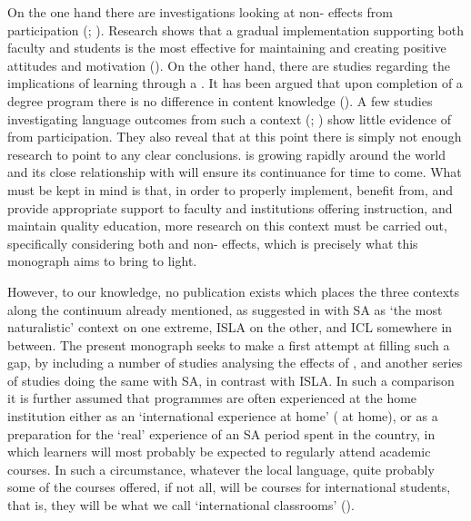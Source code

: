 \documentclass[output=paper]{langsci/langscibook}
\begin{document}
On the one hand there are investigations looking at non- effects from  participation (\citealt{Gao2008}; \citealt{GonzálezArdeo2016}). Research shows that a gradual implementation supporting both faculty and students is the most effective for maintaining and creating positive attitudes and motivation (\citealt{ChenKraklow2015}). On the other hand, there are studies regarding the  implications of learning through a  \citep{Dafouz2014}. It has been argued that upon completion of a degree program there is no difference in content knowledge (\citealt{DafouzCamacho-Miñano2016}). A few studies investigating language outcomes from such a context (\citealt{LeiHu2014};  \citealt{AmentPérez-Vidal2015,Ritcher2017}) show little evidence of  from  participation. They also reveal that at this point there is simply not enough research to point to any clear conclusions.  is growing rapidly around the world and its close relationship with  will ensure its continuance for time to come. What must be kept in mind is that, in order to properly implement, benefit from, and provide appropriate support to faculty and institutions offering  instruction, and maintain quality education, more research on this context must be carried out, specifically considering both  and non- effects, which is precisely what this monograph aims to bring to light. 

However, to our knowledge, no publication exists which places the three contexts along the continuum already mentioned, as suggested in \citet{Pérez-Vidal2011,Pérez-Vidal2014b} with SA as ‘the most naturalistic’ context on one extreme, ISLA on the other, and ICL somewhere in between. The present monograph seeks to make a first attempt at filling such a gap, by including a number of studies analysing the effects of , and another series of studies doing the same with SA, in contrast with ISLA. In such a comparison it is further assumed that  programmes are often experienced at the home institution either as an ‘international experience at home’ ( at home), or as a preparation for the ‘real’ experience of an SA period spent in the  country, in which learners will most probably be expected to regularly attend academic courses. In such a circumstance, whatever the local language, quite probably some of the courses offered, if not all, will be  courses for international students, that is, they will be what we call ‘international classrooms’ (\citealt{Coleman2013EMI,Leask2015}). 
\end{document}
